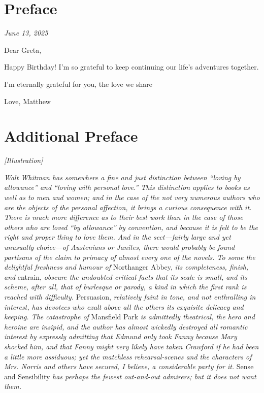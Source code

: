 \chapter{Preface}
\normalsize
\vspace{-1em}
\footnotesize{
    \begin{flushright}
    \textit{June 13, 2025}
    \end{flushright}
\vspace{-1em}
Dear Greta,

Happy Birthday! I'm so grateful to keep continuing our life's adventures together.

I'm eternally grateful for you, the love we share

\begin{flushright}
    \textemdash{} Love, Matthew
\end{flushright}
}



\chapter{Additional Preface}

\emph{[Illustration]}

\textit{Walt Whitman has somewhere a fine and just distinction between ``loving by allowance'' and ``loving with personal love.'' This distinction applies to books as well as to men and women; and in the case of the not very numerous authors who are the objects of the personal affection, it brings a curious consequence with it. There is much more difference as to their best work than in the case of those others who are loved ``by allowance'' by convention, and because it is felt to be the right and proper thing to love them. And in the sect---fairly large and yet unusually choice---of Austenians or Janites, there would probably be found partisans of the claim to primacy of almost every one of the novels. To some the delightful freshness and humour of} Northanger Abbey, \textit{its completeness, finish, and} entrain, \textit{obscure the undoubted critical facts that its scale is small, and its scheme, after all, that of burlesque or parody, a kind in which the first rank is reached with difficulty.} Persuasion, \textit{relatively faint in tone, and not enthralling in interest, has devotees who exalt above all the others its exquisite delicacy and keeping. The catastrophe of} Mansfield Park \textit{is admittedly theatrical, the hero and heroine are insipid, and the author has almost wickedly destroyed all romantic interest by expressly admitting that Edmund only took Fanny because Mary shocked him, and that Fanny might very likely have taken Crawford if he had been a little more assiduous; yet the matchless rehearsal-scenes and the characters of Mrs. Norris and others have secured, I believe, a considerable party for it.} Sense and Sensibility \textit{has perhaps the fewest out-and-out admirers; but it does not want them.}

